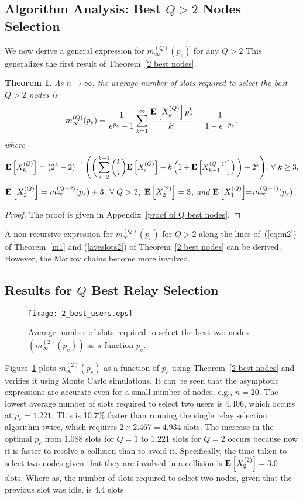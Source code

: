 \documentclass[12pt,draftcls,peerreview, onecolumn]{IEEEtran}
\newtheorem{theorem}{{\bf Theorem}}
\newcommand{\eqn}[1]{(\ref{#1})}
\newcommand{\expect}[1]{{\bf E}\left[{#1}\right]}
\newcommand{\EXQ}[2]{\expect{X_{#1}^{(#2)}}}
\newcommand{\aveslotsQ}[2]{m_{#1}^{(#2)}}
\begin{document}
\subsection{Algorithm Analysis:  Best $Q>2$ Nodes Selection}
We now derive a general expression for $\aveslotsQ{\infty}{Q}(p_e)$
for any $Q>2$ This generalizes the first result of Theorem~\ref{2 best
  nodes}.


\begin{theorem}
\label{Q best nodes}
As $n\to \infty$, the average number of slots
required to select the  best $Q>2$ nodes is
\begin{equation}
\label{aveslotsQ}
\aveslotsQ{\infty}{Q}(p_e) =\frac{1}{e^{p_e}-1} \sum_{k=1}^\infty \frac{\EXQ{k}{Q}p_e^k}{k!}  + \frac{1}{1-e^{-p_e}},
 \end{equation}
where
\begin{equation}
\label{EX_k[Q]}
 \EXQ{k}{Q}=
\left(2^{k}-2\right)^{-1}\Bigg(\bigg(\sum_{i=2}^{k-1} \binom{k}{i}\EXQ{i}{Q} + k\left(1+\EXQ{k-1}{Q-1}\right) \bigg)+2^k\Bigg), \: \forall~k \ge 3,
\end{equation}
$\EXQ{2}{Q}=\aveslotsQ{\infty}{Q-2}(p_e) + 3, \; \forall \; Q > 2$, $ \EXQ{2}{2}=3$, and $\EXQ{1}{Q}\!\!=\!\aveslotsQ{\infty}{Q-1}(p_e)$.
\end{theorem}
\begin{proof}
The proof is given in Appendix~\ref{proof of Q best nodes}.
\end{proof}
A non-recursive expression for $\aveslotsQ{\infty}{Q}(p_e)$ for $Q>2$
along the lines of~\eqn{eq:m2} of Theorem~\ref{m1} and \eqn{aveslots2}
of Theorem~\ref{2 best nodes} can be derived.  However, the Markov
chains become more involved.


\subsection{Results for $Q$ Best Relay Selection}

\begin{figure}[p]
  \centering \texttt{[image: 2\_best\_users.eps]}
\caption{Average number of slots required to select the  best two nodes~$(\aveslotsQ{\infty}{2}(p_e))$ as a function $p_e$.}
\label{fig:2_best_nodes}
\end{figure}


Figure~\ref{fig:2_best_nodes} plots $\aveslotsQ{\infty}{2}(p_e)$ as a
function of $p_e$ using Theorem~\ref{2 best nodes} and verifies it
using Monte Carlo simulations. It can be seen that the asymptotic
expressions are accurate even for a small number of nodes, e.g., $n =
20$. The lowest average number of slots required to select two users
is $4.406$, which occurs at $p_e=1.221$.  This is 10.7\% faster than
running the single relay selection algorithm twice, which requires $2
\times 2.467 = 4.934$ slots. The increase in the optimal $p_e$ from
$1.088$ slots for $Q = 1$ to $1.221$ slots for $Q = 2$ occurs because
now it is faster to resolve a collision than to avoid it.
Specifically, the time taken to select two nodes given that they are
involved in a collision is $\EXQ{2}{2}=3.0$ slots.  Where as, the
number of slots required to select two nodes, given that the previous
slot was idle, is $4.4$ slots.
\end{document}
